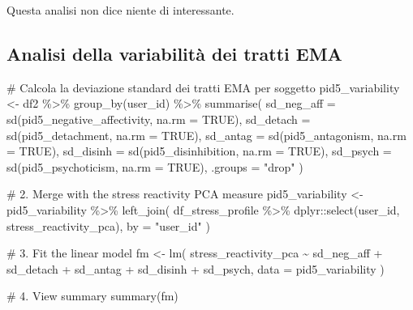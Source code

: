\documentclass[
  11pt,
  a4paper,
  onecolumn]{article}
\newenvironment{Shaded}{}{}
\newcommand{\AttributeTok}[1]{\textcolor[rgb]{0.84,0.23,0.29}{#1}}
\newcommand{\CommentTok}[1]{\textcolor[rgb]{0.42,0.45,0.49}{#1}}
\newcommand{\ConstantTok}[1]{\textcolor[rgb]{0.00,0.36,0.77}{#1}}
\newcommand{\FunctionTok}[1]{\textcolor[rgb]{0.44,0.26,0.76}{#1}}
\newcommand{\NormalTok}[1]{\textcolor[rgb]{0.14,0.16,0.18}{#1}}
\newcommand{\OtherTok}[1]{\textcolor[rgb]{0.44,0.26,0.76}{#1}}
\newcommand{\SpecialCharTok}[1]{\textcolor[rgb]{0.00,0.36,0.77}{#1}}
\newcommand{\StringTok}[1]{\textcolor[rgb]{0.01,0.18,0.38}{#1}}
\begin{document}
Questa analisi non dice niente di interessante.

\subsection{Analisi della variabilità dei tratti
EMA}\label{analisi-della-variabilituxe0-dei-tratti-ema}

\begin{Shaded}
\begin{Highlighting}[]
\CommentTok{\# Calcola la deviazione standard dei tratti EMA per soggetto}
\NormalTok{pid5\_variability }\OtherTok{\textless{}{-}}\NormalTok{ df2 }\SpecialCharTok{\%\textgreater{}\%}
  \FunctionTok{group\_by}\NormalTok{(user\_id) }\SpecialCharTok{\%\textgreater{}\%}
  \FunctionTok{summarise}\NormalTok{(}
    \AttributeTok{sd\_neg\_aff =} \FunctionTok{sd}\NormalTok{(pid5\_negative\_affectivity, }\AttributeTok{na.rm =} \ConstantTok{TRUE}\NormalTok{),}
    \AttributeTok{sd\_detach  =} \FunctionTok{sd}\NormalTok{(pid5\_detachment, }\AttributeTok{na.rm =} \ConstantTok{TRUE}\NormalTok{),}
    \AttributeTok{sd\_antag   =} \FunctionTok{sd}\NormalTok{(pid5\_antagonism, }\AttributeTok{na.rm =} \ConstantTok{TRUE}\NormalTok{),}
    \AttributeTok{sd\_disinh  =} \FunctionTok{sd}\NormalTok{(pid5\_disinhibition, }\AttributeTok{na.rm =} \ConstantTok{TRUE}\NormalTok{),}
    \AttributeTok{sd\_psych   =} \FunctionTok{sd}\NormalTok{(pid5\_psychoticism, }\AttributeTok{na.rm =} \ConstantTok{TRUE}\NormalTok{),}
    \AttributeTok{.groups =} \StringTok{"drop"}
\NormalTok{  )}

\CommentTok{\# 2. Merge with the stress reactivity PCA measure}
\NormalTok{pid5\_variability }\OtherTok{\textless{}{-}}\NormalTok{ pid5\_variability }\SpecialCharTok{\%\textgreater{}\%}
  \FunctionTok{left\_join}\NormalTok{(}
\NormalTok{    df\_stress\_profile }\SpecialCharTok{\%\textgreater{}\%}\NormalTok{ dplyr}\SpecialCharTok{::}\FunctionTok{select}\NormalTok{(user\_id, stress\_reactivity\_pca),}
    \AttributeTok{by =} \StringTok{"user\_id"}
\NormalTok{  )}

\CommentTok{\# 3. Fit the linear model}
\NormalTok{fm }\OtherTok{\textless{}{-}} \FunctionTok{lm}\NormalTok{(}
\NormalTok{  stress\_reactivity\_pca }\SpecialCharTok{\textasciitilde{}}\NormalTok{ sd\_neg\_aff }\SpecialCharTok{+}\NormalTok{ sd\_detach }\SpecialCharTok{+}\NormalTok{ sd\_antag }\SpecialCharTok{+}\NormalTok{ sd\_disinh }\SpecialCharTok{+}\NormalTok{ sd\_psych, }
  \AttributeTok{data =}\NormalTok{ pid5\_variability}
\NormalTok{)}

\CommentTok{\# 4. View summary}
\FunctionTok{summary}\NormalTok{(fm)}
\end{Highlighting}
\end{Shaded}
\end{document}
